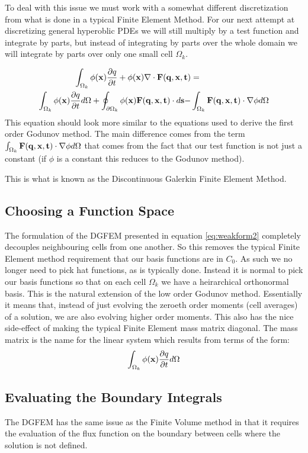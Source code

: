 \documentclass[10]{amsart}
\begin{document}
 To deal with this issue we must work with a somewhat different 
 discretization from what is done in a typical Finite Element Method. For our next attempt at discretizing general hyperoblic
 PDEs we will still multiply by a test function and integrate by parts, but instead of integrating by parts over the whole domain
 we will integrate by parts over only one small cell $\Omega_k$. 
 
 \begin{align}
 \int_{\Omega_k} \phi({\bf x}) \frac{\partial q}{\partial t} + \phi({\bf x}) \nabla \cdot {\bf F(q,x,t)}
&=\\ \int_{\Omega_k} \phi({\bf x}) \frac{\partial q}{\partial t} d\Omega +\oint_{\partial \Omega_k} \phi({\bf x}) {\bf F(q,x,t)} \cdot d{\bf s}
 -&\int_{\Omega_k}{\bf F(q,x,t)} \cdot \nabla \phi d\Omega \label{eq:weakform2}
 \end{align}
 This equation should look more similar to the equations used to derive the first order Godunov method. The main difference
 comes from the term $\int_{\Omega_k}{\bf F(q,x,t)} \cdot \nabla \phi d\Omega$ that comes from the fact that our
 test function is not just a constant (if $\phi$ is a constant this reduces to the Godunov method).
 
 This is what is known as the Discontinuous Galerkin Finite Element Method. 
 
 \subsection{Choosing a Function Space}
 The formulation of the DGFEM presented in equation \eqref{eq:weakform2} completely decouples neighbouring cells from one another.
 So this removes the typical Finite Element method requirement that our basis functions are in $C_0$. As such we no longer
 need to pick hat functions, as is typically done. Instead it is normal to pick our basis functions so that on each
 cell $\Omega_k$ we have a heirarchical orthonormal basis. This is the natural extension of the low order Godunov method.
 Essentially it means that, instead of just evolving the zeroeth order moments (cell averages) of a solution, we are also
 evolving higher order moments. This also has the nice side-effect of making the typical Finite Element mass matrix  
 diagonal. The mass matrix is the name for the linear system which results from terms of the form:
 $$\int_{\Omega_k} \phi({\bf x}) \frac{\partial q}{\partial t} d\Omega $$
 
 \subsection{Evaluating the Boundary Integrals}
 The DGFEM has the same issue as the Finite Volume method in that it requires the evaluation of the flux function
 on the boundary between cells where the solution is not defined. 
 
\end{document}
